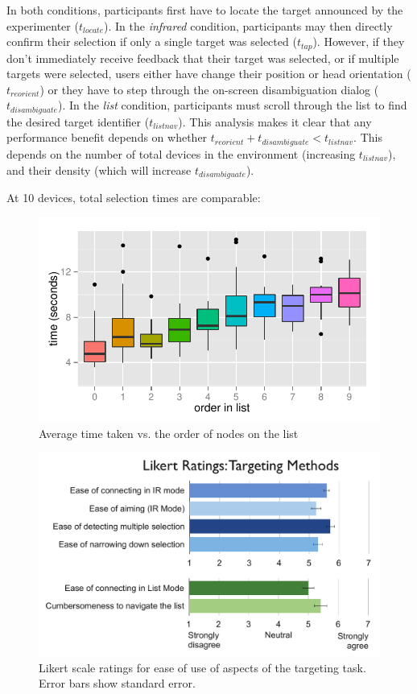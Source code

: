 In both conditions, participants first have to locate the target announced by the experimenter ($t_{locate}$). In the {\em infrared} condition, participants may then directly confirm their selection if only a single target was selected ($t_{tap}$). However, if they don't immediately receive feedback that their target was selected, or if multiple targets were selected, users either have change their position or head orientation ($t_{reorient}$) or they have to step through the on-screen disambiguation dialog ($t_{disambiguate}$). In the {\em list} condition, participants must scroll through the list to find the desired target identifier ($t_{listnav}$).
This analysis makes it clear that any performance benefit depends on whether $t_{reorient}+t_{disambiguate}<t_{listnav}$. This depends on the number of total devices in the environment (increasing $t_{listnav}$), and their density (which will increase $t_{disambiguate}$). 

At 10 devices, total selection times are comparable:

\begin{figure}[t]
\centering
\includegraphics[width=1.0\columnwidth]{figures/R_List_by_Target.pdf}
\caption{Average time taken vs. the order of nodes on the list }
\label{fig:time-vs-list-order}
\end{figure}


\begin{figure}[t]
\centering
\includegraphics[width=1.0\columnwidth]{figures/target-likert.pdf}
\caption{Likert scale ratings for ease of use of aspects of the targeting task. Error bars show standard error. }
\label{fig:target-likert}
\end{figure}

